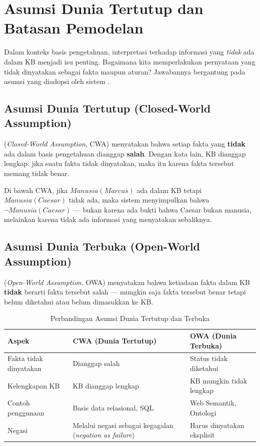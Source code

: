 \section{Asumsi Dunia Tertutup dan Batasan Pemodelan}

Dalam konteks basis pengetahuan, interpretasi terhadap informasi yang \emph{tidak} ada dalam KB menjadi isu penting. Bagaimana kita memperlakukan pernyataan yang tidak dinyatakan sebagai fakta maupun aturan? Jawabannya bergantung pada asumsi yang diadopsi oleh sistem \cite{rosen2019}.

\subsection{Asumsi Dunia Tertutup (Closed-World Assumption)}

\begin{definisi}
 (\textit{Closed-World Assumption}, CWA) menyatakan bahwa setiap fakta yang \textbf{tidak} ada dalam basis pengetahuan dianggap \textbf{salah}. Dengan kata lain, KB dianggap lengkap: jika suatu fakta tidak dinyatakan, maka itu karena fakta tersebut memang tidak benar.
\end{definisi}

Di bawah CWA, jika $Manusia(Marcus)$ ada dalam KB tetapi $Manusia(Caesar)$ tidak ada, maka sistem menyimpulkan bahwa $\neg Manusia(Caesar)$ --- bukan karena ada bukti bahwa Caesar bukan manusia, melainkan karena tidak ada informasi yang menyatakan sebaliknya.

\subsection{Asumsi Dunia Terbuka (Open-World Assumption)}

\begin{definisi}
 (\textit{Open-World Assumption}, OWA) menyatakan bahwa ketiadaan fakta dalam KB \textbf{tidak} berarti fakta tersebut salah --- mungkin saja fakta tersebut benar tetapi belum diketahui atau belum dimasukkan ke KB.
\end{definisi}

\begin{table}[H]
\centering
\renewcommand{\arraystretch}{1.3}
\begin{tabular}{|p{3.5cm}|p{4cm}|p{4.5cm}|}
\hline
\textbf{Aspek} & \textbf{CWA (Dunia Tertutup)} & \textbf{OWA (Dunia Terbuka)} \\ \hline
Fakta tidak dinyatakan & Dianggap salah & Status tidak diketahui \\ \hline
Kelengkapan KB & KB dianggap lengkap & KB mungkin tidak lengkap \\ \hline
Contoh penggunaan & Basis data relasional, SQL & Web Semantik, Ontologi \\ \hline
Negasi & Melalui negasi sebagai kegagalan (\textit{negation as failure}) & Harus dinyatakan eksplisit \\ \hline
\end{tabular}
\caption{Perbandingan Asumsi Dunia Tertutup dan Terbuka}
\end{table}


